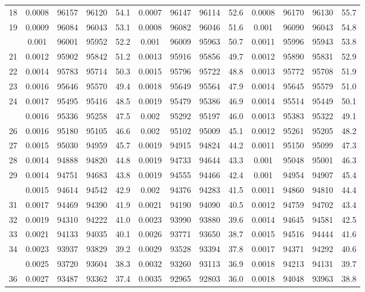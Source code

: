 \documentclass[
  14pt,
]{article}
\begin{document}
\begin{longtable}[t]{lcccccccccccc}
18 & 0.0008 & 96157 & 96120 & 54.1 & 0.0007 & 96147 & 96114 & 52.6 & 0.0008 & 96170 & 96130 & 55.7\\
19 & 0.0009 & 96084 & 96043 & 53.1 & 0.0008 & 96082 & 96046 & 51.6 & 0.001 & 96090 & 96043 & 54.8\\
\addlinespace
20 & 0.001 & 96001 & 95952 & 52.2 & 0.001 & 96009 & 95963 & 50.7 & 0.0011 & 95996 & 95943 & 53.8\\
21 & 0.0012 & 95902 & 95842 & 51.2 & 0.0013 & 95916 & 95856 & 49.7 & 0.0012 & 95890 & 95831 & 52.9\\
22 & 0.0014 & 95783 & 95714 & 50.3 & 0.0015 & 95796 & 95722 & 48.8 & 0.0013 & 95772 & 95708 & 51.9\\
23 & 0.0016 & 95646 & 95570 & 49.4 & 0.0018 & 95649 & 95564 & 47.9 & 0.0014 & 95645 & 95579 & 51.0\\
24 & 0.0017 & 95495 & 95416 & 48.5 & 0.0019 & 95479 & 95386 & 46.9 & 0.0014 & 95514 & 95449 & 50.1\\
\addlinespace
25 & 0.0016 & 95336 & 95258 & 47.5 & 0.002 & 95292 & 95197 & 46.0 & 0.0013 & 95383 & 95322 & 49.1\\
26 & 0.0016 & 95180 & 95105 & 46.6 & 0.002 & 95102 & 95009 & 45.1 & 0.0012 & 95261 & 95205 & 48.2\\
27 & 0.0015 & 95030 & 94959 & 45.7 & 0.0019 & 94915 & 94824 & 44.2 & 0.0011 & 95150 & 95099 & 47.3\\
28 & 0.0014 & 94888 & 94820 & 44.8 & 0.0019 & 94733 & 94644 & 43.3 & 0.001 & 95048 & 95001 & 46.3\\
29 & 0.0014 & 94751 & 94683 & 43.8 & 0.0019 & 94555 & 94466 & 42.4 & 0.001 & 94954 & 94907 & 45.4\\
\addlinespace
30 & 0.0015 & 94614 & 94542 & 42.9 & 0.002 & 94376 & 94283 & 41.5 & 0.0011 & 94860 & 94810 & 44.4\\
31 & 0.0017 & 94469 & 94390 & 41.9 & 0.0021 & 94190 & 94090 & 40.5 & 0.0012 & 94759 & 94702 & 43.4\\
32 & 0.0019 & 94310 & 94222 & 41.0 & 0.0023 & 93990 & 93880 & 39.6 & 0.0014 & 94645 & 94581 & 42.5\\
33 & 0.0021 & 94133 & 94035 & 40.1 & 0.0026 & 93771 & 93650 & 38.7 & 0.0015 & 94516 & 94444 & 41.6\\
34 & 0.0023 & 93937 & 93829 & 39.2 & 0.0029 & 93528 & 93394 & 37.8 & 0.0017 & 94371 & 94292 & 40.6\\
\addlinespace
35 & 0.0025 & 93720 & 93604 & 38.3 & 0.0032 & 93260 & 93113 & 36.9 & 0.0018 & 94213 & 94131 & 39.7\\
36 & 0.0027 & 93487 & 93362 & 37.4 & 0.0035 & 92965 & 92803 & 36.0 & 0.0018 & 94048 & 93963 & 38.8\\

\end{longtable}
\end{document}
